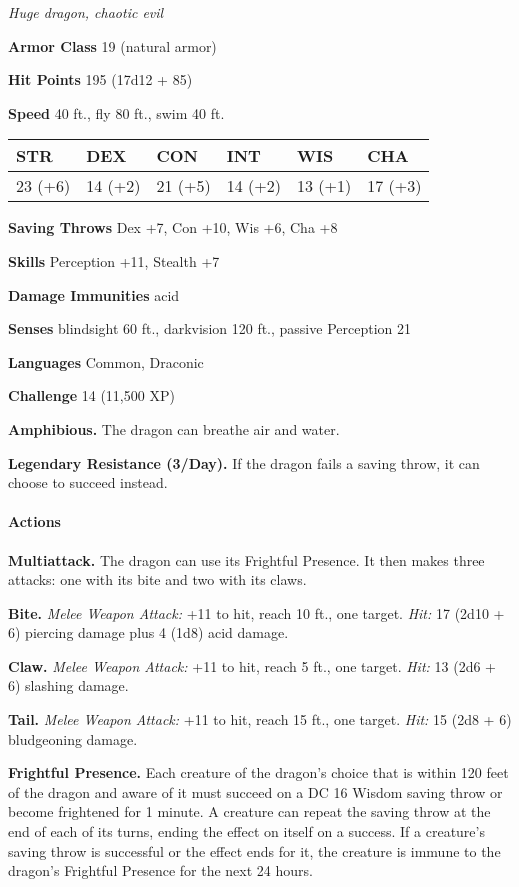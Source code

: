 \documentclass[
]{article}
\begin{document}
\emph{Huge dragon, chaotic evil}

\textbf{Armor Class} 19 (natural armor)

\textbf{Hit Points} 195 (17d12 + 85)

\textbf{Speed} 40 ft., fly 80 ft., swim 40 ft.

\begin{longtable}[]{@{}llllll@{}}
\toprule
STR & DEX & CON & INT & WIS & CHA\tabularnewline
\midrule
\endhead
23 (+6) & 14 (+2) & 21 (+5) & 14 (+2) & 13 (+1) & 17 (+3)\tabularnewline
\bottomrule
\end{longtable}

\textbf{Saving Throws} Dex +7, Con +10, Wis +6, Cha +8

\textbf{Skills} Perception +11, Stealth +7

\textbf{Damage Immunities} acid

\textbf{Senses} blindsight 60 ft., darkvision 120 ft., passive
Perception 21

\textbf{Languages} Common, Draconic

\textbf{Challenge} 14 (11,500 XP)

\textbf{Amphibious.} The dragon can breathe air and water.

\textbf{Legendary Resistance (3/Day).} If the dragon fails a saving
throw, it can choose to succeed instead.

\hypertarget{actions-24}{%
\paragraph{Actions}\label{actions-24}}

\textbf{Multiattack.} The dragon can use its Frightful Presence. It then
makes three attacks: one with its bite and two with its claws.

\textbf{Bite.} \emph{Melee Weapon Attack:} +11 to hit, reach 10 ft., one
target. \emph{Hit:} 17 (2d10 + 6) piercing damage plus 4 (1d8) acid
damage.

\textbf{Claw.} \emph{Melee Weapon Attack:} +11 to hit, reach 5 ft., one
target. \emph{Hit:} 13 (2d6 + 6) slashing damage.

\textbf{Tail.} \emph{Melee Weapon Attack:} +11 to hit, reach 15 ft., one
target. \emph{Hit:} 15 (2d8 + 6) bludgeoning damage.

\textbf{Frightful Presence.} Each creature of the dragon's choice that
is within 120 feet of the dragon and aware of it must succeed on a DC 16
Wisdom saving throw or become frightened for 1 minute. A creature can
repeat the saving throw at the end of each of its turns, ending the
effect on itself on a success. If a creature's saving throw is
successful or the effect ends for it, the creature is immune to the
dragon's Frightful Presence for the next 24 hours.
\end{document}
